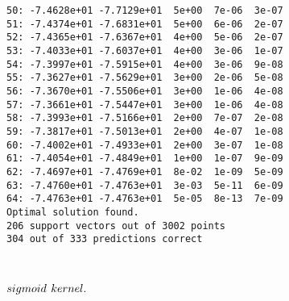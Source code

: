 \documentclass[11pt]{article}
\begin{document}
\begin{Verbatim}[commandchars=\\\{\}]
50: -7.4628e+01 -7.7129e+01  5e+00  7e-06  3e-07
51: -7.4374e+01 -7.6831e+01  5e+00  6e-06  2e-07
52: -7.4365e+01 -7.6367e+01  4e+00  5e-06  2e-07
53: -7.4033e+01 -7.6037e+01  4e+00  3e-06  1e-07
54: -7.3997e+01 -7.5915e+01  4e+00  3e-06  9e-08
55: -7.3627e+01 -7.5629e+01  3e+00  2e-06  5e-08
56: -7.3670e+01 -7.5506e+01  3e+00  1e-06  4e-08
57: -7.3661e+01 -7.5447e+01  3e+00  1e-06  4e-08
58: -7.3993e+01 -7.5166e+01  2e+00  7e-07  2e-08
59: -7.3817e+01 -7.5013e+01  2e+00  4e-07  1e-08
60: -7.4002e+01 -7.4933e+01  2e+00  3e-07  1e-08
61: -7.4054e+01 -7.4849e+01  1e+00  1e-07  9e-09
62: -7.4697e+01 -7.4769e+01  8e-02  1e-09  5e-09
63: -7.4760e+01 -7.4763e+01  3e-03  5e-11  6e-09
64: -7.4763e+01 -7.4763e+01  5e-05  8e-13  7e-09
Optimal solution found.
206 support vectors out of 3002 points
304 out of 333 predictions correct

    \end{Verbatim}

    \begin{center}
    \end{center}
    { \hspace*{\fill} \\}
    
    \(\large sigmoid\ kernel.\)
\end{document}
